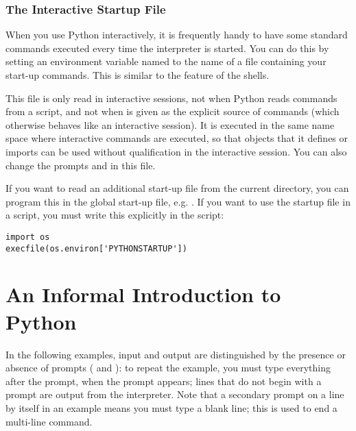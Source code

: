 \documentclass{manual}
\begin{document}
\subsection{The Interactive Startup File}
\label{startup}


When you use Python interactively, it is frequently handy to have some
standard commands executed every time the interpreter is started.  You
can do this by setting an environment variable named
 to the name of a file containing your start-up
commands.  This is similar to the  feature of the \UNIX{}
shells.

This file is only read in interactive sessions, not when Python reads
commands from a script, and not when  is given as the
explicit source of commands (which otherwise behaves like an
interactive session).  It is executed in the same name space where
interactive commands are executed, so that objects that it defines or
imports can be used without qualification in the interactive session.
You can also change the prompts  and  in
this file.

If you want to read an additional start-up file from the current
directory, you can program this in the global start-up file, e.g.
.  If you want to use the startup file
in a script, you must write this explicitly in the script:

\begin{verbatim}
import os
execfile(os.environ['PYTHONSTARTUP'])
\end{verbatim}

\chapter{An Informal Introduction to Python}
\label{informal}

In the following examples, input and output are distinguished by the
presence or absence of prompts (\samp{>>> } and ): to repeat
the example, you must type everything after the prompt, when the
prompt appears; lines that do not begin with a prompt are output from
the interpreter.%
Note that a secondary prompt on a line by itself in an example means
you must type a blank line; this is used to end a multi-line command.
\end{document}

